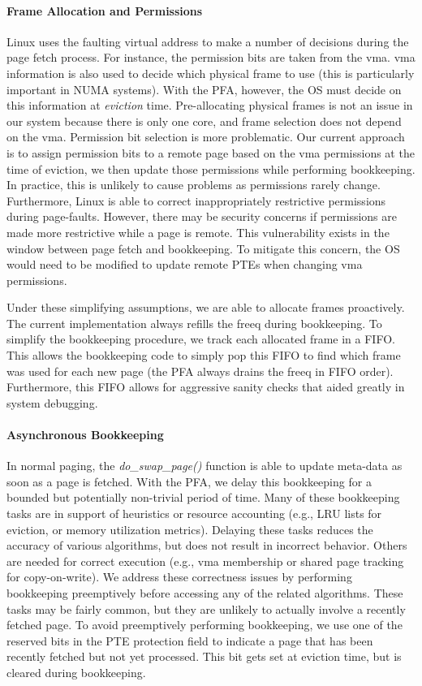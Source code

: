 \paragraph{Frame Allocation and Permissions}
Linux uses the faulting virtual address to make a number of decisions during
the page fetch process. For instance, the permission bits are taken from the
\gls{vma}. \gls{vma} information is also used to decide which physical frame to
use (this is particularly important in NUMA systems). With the PFA, however,
the OS must decide on this information at \emph{eviction} time. Pre-allocating
physical frames is not an issue in our system because there is only one core,
and frame selection does not depend on the \gls{vma}. Permission bit selection
is more problematic. Our current approach is to assign permission bits to a
remote page based on the \gls{vma} permissions at the time of eviction, we then
update those permissions while performing bookkeeping. In practice, this is
unlikely to cause problems as permissions rarely change. Furthermore, Linux is
able to correct inappropriately restrictive permissions during page-faults.
However, there may be security concerns if permissions are made more
restrictive while a page is remote. This vulnerability exists in the window
between page fetch and bookkeeping. To mitigate this concern, the OS would need
to be modified to update remote PTEs when changing \gls{vma} permissions.

Under these simplifying assumptions, we are able to allocate frames
proactively. The current implementation always refills the \gls{freeq} during
bookkeeping. To simplify the bookkeeping procedure, we track
each allocated frame in a FIFO. This allows the bookkeeping code to simply pop
this FIFO to find which frame was used for each new page (the PFA always drains
the \gls{freeq} in FIFO order). Furthermore, this FIFO allows for aggressive
sanity checks that aided greatly in system debugging.

\paragraph{Asynchronous Bookkeeping}
In normal paging, the \emph{do\_swap\_page()} function is able to update meta-data as
soon as a page is fetched. With the PFA, we delay this bookkeeping for a
bounded but potentially non-trivial period of time. Many of these bookkeeping
tasks are in support of heuristics or resource accounting (e.g., LRU lists for
eviction, or memory utilization metrics). Delaying these tasks reduces the
accuracy of various algorithms, but does not result in incorrect behavior.
Others are needed for correct execution (e.g., \gls{vma} membership or shared
page tracking for copy-on-write). We address these correctness issues by
performing bookkeeping preemptively before accessing any of the related
algorithms. These tasks may be fairly common, but they are unlikely to actually
involve a recently fetched page. To avoid preemptively performing bookkeeping,
we use one of the reserved bits in the PTE protection field to indicate a page
that has been recently fetched but not yet processed. This bit gets set at
eviction time, but is cleared during bookkeeping.

